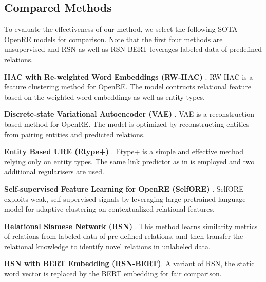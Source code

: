 \documentclass[11pt]{article}
\begin{document}
    \subsection{Compared Methods}To evaluate the effectiveness of our method, we select the following SOTA OpenRE models for comparison. Note that the first four methods are unsupervised and RSN as well as RSN-BERT leverages labeled data of predefined relations.
        
        \noindent\textbf{HAC with Re-weighted Word Embeddings (RW-HAC)} \citep{10.1007/978-3-319-70407-4_3}. RW-HAC is a feature clustering method for OpenRE. The model contructs relational feature based on the weighted word embeddings as well as entity types.


        \noindent\textbf{Discrete-state Variational Autoencoder (VAE)} \citep{marcheggiani-titov-2016-discrete}. VAE is a reconstruction-based method for OpenRE. The model is optimized by reconstructing entities from pairing entities and predicted relations. 

        \noindent\textbf{Entity Based URE (Etype+)} \citep{tran-etal-2020-revisiting}. Etype+ is a simple and effective method relying only on entity types. The same link predictor as in \citep{marcheggiani-titov-2016-discrete} is employed and two additional regularisers are used.
        
        \noindent\textbf{Self-supervised Feature Learning for OpenRE (SelfORE)} \citep{hu2020selfore}. SelfORE exploits weak, self-supervised signals by leveraging large pretrained language model for adaptive clustering on contextualized relational features.
        
        \noindent\textbf{Relational Siamese Network (RSN)} \citep{wu-etal-2019-open}. This method learns similarity metrics of relations from labeled data of pre-defined relations, and then transfer the relational knowledge to identify novel relations in unlabeled data. 
        
        \noindent\textbf{RSN with BERT Embedding (RSN-BERT)}. A variant of RSN, the static word vector is replaced by the BERT embedding for fair comparison.
        
\end{document}
